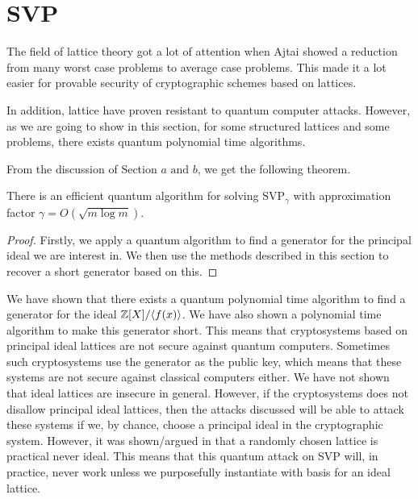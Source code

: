 \section{SVP}
The field of lattice theory got a lot of attention when Ajtai\cite{Ajtai} showed a reduction from many worst case problems to average case problems. This made it a lot easier for provable security of cryptographic schemes based on lattices. \par
In addition, lattice have proven resistant to quantum computer attacks. However, as we are going to show in this section, for some structured lattices and some problems, there exists quantum polynomial time algorithms.\par
From the discussion of Section \(a \text{ and } b\), we get the following theorem.
\begin{theorem}
There is an efficient quantum algorithm for solving \(\text{SVP}_\gamma\) with approximation factor \(\gamma = O(\sqrt{m\log m})\).
\end{theorem}
\begin{proof}
Firstly, we apply a quantum algorithm to find a generator for the principal ideal we are interest in. We then use the methods described in this section to recover a short generator based on this.
\end{proof}

We have shown that there exists a quantum polynomial time algorithm to find a generator for the ideal \(\mathbb{Z}[X]/\langle f(x) \rangle\). We have also shown a polynomial time algorithm to make this generator short. This means that cryptosystems based on principal ideal lattices are not secure against quantum computers. Sometimes such cryptosystems use the generator as the public key, which means that these systems are not secure against classical computers either.   We have not shown that ideal lattices are insecure in general. However, if the cryptosystems does not disallow principal ideal lattices, then the attacks discussed will be able to attack these systems if we, by chance, choose a principal ideal in the cryptographic system. However, it was shown/argued in \cite{Identifying Ideal Lattices} that a randomly chosen lattice is practical never ideal. This means that this quantum attack on SVP will, in practice, never work unless we purposefully instantiate with basis for an ideal lattice.